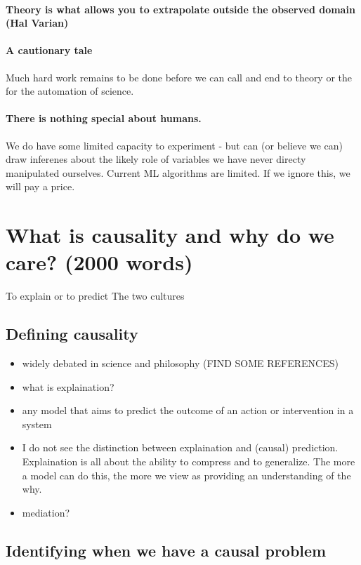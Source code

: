 \documentclass[11pt,a4paper,oneside]{book}
\begin{document}
\paragraph*{Theory is what allows you to extrapolate outside the observed domain (Hal Varian)}

\paragraph*{A cautionary tale} Much hard work remains to be done before we can call and end to theory or the for the automation of science. 

\paragraph*{There is nothing special about humans.} We do have some limited capacity to experiment - but can (or believe we can) draw inferenes about the likely role of variables we have never directy manipulated ourselves. Current ML algorithms are limited. If we ignore this, we will pay a price.

\section*{What is causality and why do we care? (2000 words)}

To explain or to predict \cite{Shmueli2010}
The two cultures \cite{Breiman2001}

\subsection*{Defining causality}
\begin{itemize}
\item widely debated in science and philosophy (FIND SOME REFERENCES)
\item what is explaination?
\item any model that aims to predict the outcome of an action or intervention in a system
\item I do not see the distinction between explaination and (causal) prediction. Explaination is all about the ability to compress and to generalize. The more a model can do this, the more we view as providing an understanding of the why. 
\item mediation?
\end{itemize}

\subsection*{Identifying when we have a causal problem}
\end{document}
